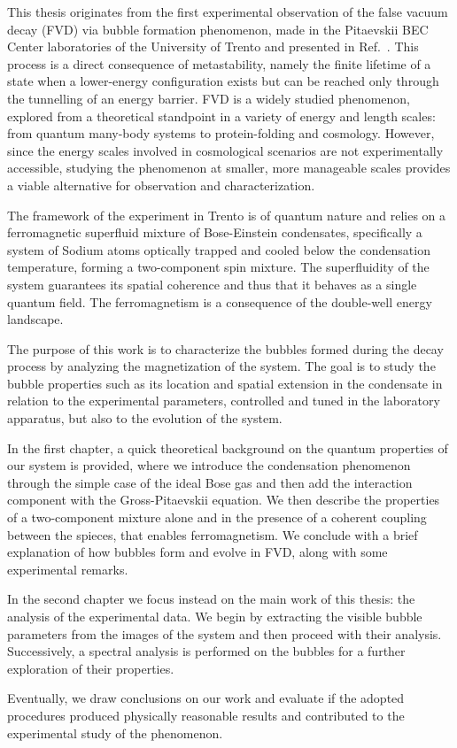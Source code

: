 This thesis originates from the first experimental observation of the false vacuum decay (FVD) via bubble formation phenomenon, made in the Pitaevskii BEC Center laboratories of the University of Trento and presented in Ref.\ \cite{zenesini2024false}. This process is a direct consequence of metastability, namely the finite lifetime of a state when a lower-energy configuration exists but can be reached only through the tunnelling of an energy barrier. FVD is a widely studied phenomenon, explored from a theoretical standpoint in a variety of energy and length scales: from quantum many-body systems to protein-folding and cosmology. However, since the energy scales involved in cosmological scenarios are not experimentally accessible, studying the phenomenon at smaller, more manageable scales provides a viable alternative for observation and characterization.

The framework of the experiment in Trento is of quantum nature and relies on a ferromagnetic superfluid mixture of Bose-Einstein condensates, specifically a system of Sodium atoms optically trapped and cooled below the condensation temperature, forming a two-component spin mixture. The superfluidity of the system guarantees its spatial coherence and thus that it behaves as a single quantum field. The ferromagnetism is a consequence of the double-well energy landscape.

The purpose of this work is to characterize the bubbles formed during the decay process by analyzing the magnetization of the system. The goal is to study the bubble properties such as its location and spatial extension in the condensate in relation to the experimental parameters, controlled and tuned in the laboratory apparatus, but also to the evolution of the system. 

In the first chapter, a quick theoretical background on the quantum properties of our system is provided, where we introduce the condensation phenomenon through the simple case of the ideal Bose gas and then add the interaction component with the Gross-Pitaevskii equation. We then describe the properties of a two-component mixture alone and in the presence of a coherent coupling between the spieces, that enables ferromagnetism. We conclude with a brief explanation of how bubbles form and evolve in FVD, along with some experimental remarks.

In the second chapter we focus instead on the main work of this thesis: the analysis of the experimental data. We begin by extracting the visible bubble parameters from the images of the system and then proceed with their analysis. Successively, a spectral analysis is performed on the bubbles for a further exploration of their properties.

Eventually, we draw conclusions on our work and evaluate if the adopted procedures produced physically reasonable results and contributed to the experimental study of the phenomenon.